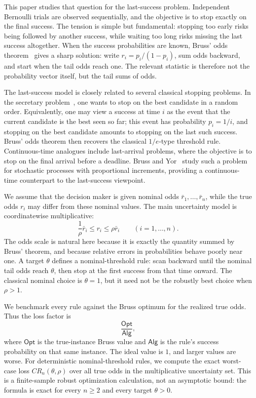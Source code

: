 \documentclass[11pt,a4paper]{article}
\newcommand{\alg}{\mathsf{Alg}}
\newcommand{\opt}{\mathsf{Opt}}
\begin{document}
This paper studies that question for the last-success problem.  Independent
Bernoulli trials are observed sequentially, and the objective is to stop exactly
on the final success.  The tension is simple but fundamental: stopping too early
risks being followed by another success, while waiting too long risks missing
the last success altogether.  When the success probabilities are known, Bruss'
odds theorem~\cite{Bruss2000} gives a sharp solution: write
\(r_i=p_i/(1-p_i)\), sum odds backward, and start when the tail odds reach one.
The relevant statistic is therefore not the probability vector itself, but the
tail sums of odds.

The last-success model is closely related to several classical stopping
problems.  In the secretary problem~\cite{GilbertMosteller1966}, one wants to
stop on the best candidate in a random order.  Equivalently, one may view a
success at time \(i\) as the event that the current candidate is the best seen so
far; this event has probability \(p_i=1/i\), and stopping on the best candidate
amounts to stopping on the last such success.  Bruss' odds theorem then recovers
the classical \(1/e\)-type threshold rule.  Continuous-time analogues include
last-arrival problems, where the objective is to stop on the final arrival
before a deadline.  Bruss and Yor~\cite{BrussYor2012} study such a problem for
stochastic processes with proportional increments, providing a continuous-time
counterpart to the last-success viewpoint.

We assume that the decision maker is given nominal odds
\(\bar r_1,\ldots,\bar r_n\), while the true odds \(r_i\) may differ from these
nominal values.  The main uncertainty model is coordinatewise multiplicative:
\[
  \frac1\rho\bar r_i\le r_i\le\rho\bar r_i
  \qquad (i=1,\ldots,n).
\]
The odds scale is natural here because it is exactly the quantity summed by
Bruss' theorem, and because relative errors in probabilities behave poorly near
one.  A target \(\theta\) defines a nominal-threshold rule: scan backward until
the nominal tail odds reach \(\theta\), then stop at the first success from that
time onward.  The classical nominal choice is \(\theta=1\), but it need not be
the robustly best choice when \(\rho>1\).

We benchmark every rule against the Bruss optimum for the realized true odds.
Thus the loss factor is
\[
  \frac{\opt}{\alg},
\]
where \(\opt\) is the true-instance Bruss value and \(\alg\) is the rule's
success probability on that same instance.  The ideal value is \(1\), and larger
values are worse.  For deterministic nominal-threshold rules, we compute the
exact worst-case loss \(CR_n(\theta,\rho)\) over all true odds in the
multiplicative uncertainty set.  This is a finite-sample robust optimization
calculation, not an asymptotic bound: the formula is exact for every \(n\ge2\)
and every target \(\theta>0\).
\end{document}

